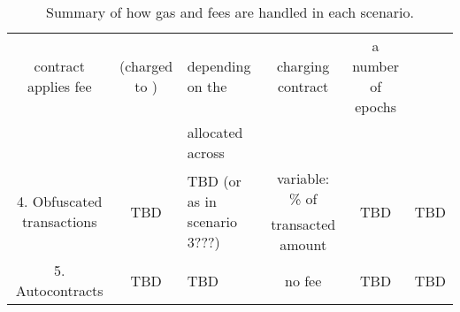 \begin{table*}[t]
\begin{spacing}{1.1}
{\begin{tabular}{| c | c | l | c | c | c |}
					contract applies fee
					& (charged to \contract)
					& \hspace{0.2cm} depending on the \gaslimit
					& charging contract
					& a number of epochs
					& 	
					\\
					& 
					& \hspace{0.2cm} allocated across \icc
					& 
					& 
					& 		
					\\ \hline	
				\multirow{2}{*}{4. Obfuscated transactions}
					& \multirow{2}{*}{TBD}
					& \multirow{2}{*}{TBD (or as in scenario 3???)}
					& variable: \% of
					& \multirow{2}{*}{TBD}
					& \multirow{2}{*}{TBD}
					\\
					
					& 
					&  
					& transacted amount
					& 
					& 	
					\\
				\hline											
				5. Autocontracts
				& TBD
				& TBD
				& no fee
				& TBD
				& TBD
				\\
				\hline		
			\end{tabular}
		}
		\caption{Summary of how gas and fees are handled in each scenario.}
		\label{tab:gas}
	\end{spacing}
\end{table*}

